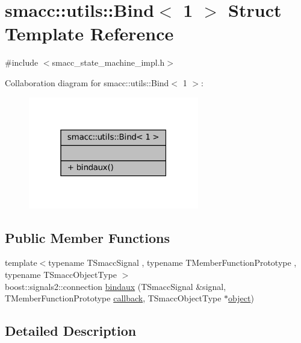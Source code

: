 \hypertarget{structsmacc_1_1utils_1_1Bind_3_011_01_4}{}\section{smacc\+:\+:utils\+:\+:Bind$<$ 1 $>$ Struct Template Reference}
\label{structsmacc_1_1utils_1_1Bind_3_011_01_4}


{\ttfamily \#include $<$smacc\+\_\+state\+\_\+machine\+\_\+impl.\+h$>$}



Collaboration diagram for smacc\+:\+:utils\+:\+:Bind$<$ 1 $>$\+:
\nopagebreak
\begin{figure}[H]
\begin{center}
\leavevmode
\includegraphics[width=211pt]{structsmacc_1_1utils_1_1Bind_3_011_01_4__coll__graph}
\end{center}
\end{figure}
\subsection*{Public Member Functions}
\begin{DoxyCompactItemize}
\item 
{\footnotesize template$<$typename T\+Smacc\+Signal , typename T\+Member\+Function\+Prototype , typename T\+Smacc\+Object\+Type $>$ }\\boost\+::signals2\+::connection \hyperlink{structsmacc_1_1utils_1_1Bind_3_011_01_4_a5704d3cff0b914fc899ff385ff8f8bc2}{bindaux} (T\+Smacc\+Signal \&signal, T\+Member\+Function\+Prototype \hyperlink{3_2servers_2opencv__perception__node_2opencv__perception__node_8cpp_a050e697bd654facce10ea3f6549669b3}{callback}, T\+Smacc\+Object\+Type $\ast$\hyperlink{classobject}{object})
\end{DoxyCompactItemize}


\subsection{Detailed Description}
